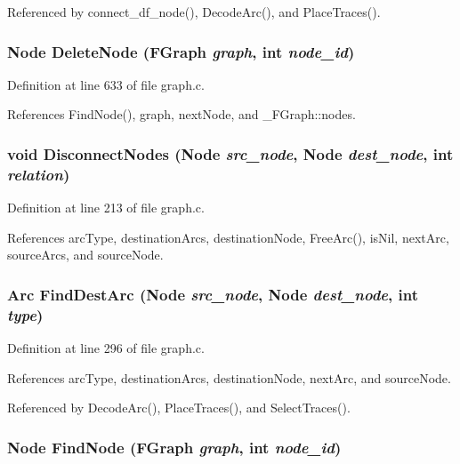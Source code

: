 Referenced by connect\_\-df\_\-node(), Decode\-Arc(), and Place\-Traces().
\subsubsection{\setlength{\rightskip}{0pt plus 5cm}\bf{Node} Delete\-Node (\bf{FGraph} {\em graph}, int {\em node\_\-id})}\label{graph_8c_23212ce3539da4ba88a53d45bb21e247}




Definition at line 633 of file graph.c.

References Find\-Node(), graph, next\-Node, and \_\-FGraph::nodes.
\subsubsection{\setlength{\rightskip}{0pt plus 5cm}void Disconnect\-Nodes (\bf{Node} {\em src\_\-node}, \bf{Node} {\em dest\_\-node}, int {\em relation})}\label{graph_8c_8e3bfa7c3094fd36c7a0d67c2cf7eb8b}




Definition at line 213 of file graph.c.

References arc\-Type, destination\-Arcs, destination\-Node, Free\-Arc(), is\-Nil, next\-Arc, source\-Arcs, and source\-Node.
\subsubsection{\setlength{\rightskip}{0pt plus 5cm}\bf{Arc} Find\-Dest\-Arc (\bf{Node} {\em src\_\-node}, \bf{Node} {\em dest\_\-node}, int {\em type})}\label{graph_8c_32c17ee45b4d7a7a8f5030dbb3dbbfea}




Definition at line 296 of file graph.c.

References arc\-Type, destination\-Arcs, destination\-Node, next\-Arc, and source\-Node.

Referenced by Decode\-Arc(), Place\-Traces(), and Select\-Traces().
\subsubsection{\setlength{\rightskip}{0pt plus 5cm}\bf{Node} Find\-Node (\bf{FGraph} {\em graph}, int {\em node\_\-id})}\label{graph_8c_21ec3ddb78f3282ba7454ea7a44426f0}




